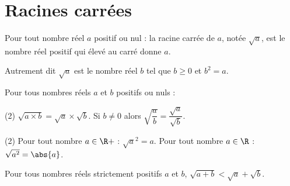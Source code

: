             \section{Racines carrées}
%
%
    \begin{dfn}
    Pour tout nombre réel $a$ positif ou nul :\newline 
    la racine carrée de $a$, notée $\sqrt{a}$, est le nombre réel positif qui élevé au carré donne $a$.
    
    Autrement dit $\sqrt{a}$ est le nombre réel $b$ tel que $b\geqslant 0$ et $b^2=a$.  
    \end{dfn}
%
    \begin{prp}
    Pour tous nombres réels $a$ et $b$ positifs ou nuls :
        \begin{tasks}[label=\labelitemi](2)
        \task $\sqrt{a\times b}=\sqrt{a}\times\sqrt{b}$.
        \task Si $b\neq 0$ alors $\sqrt{\dfrac{a}{b}}=\dfrac{\sqrt{a}}{\sqrt{b}}$.
        \end{tasks}
    \end{prp}
%
    \begin{prp}
        \begin{tasks}[label=\labelitemi](2)
        \task Pour tout nombre $a\in\R+$ : $\sqrt{a}^2=a$.
        \task Pour tout nombre $a\in\R$ : $\sqrt{a^2}=\abs{a}$.
        \end{tasks}
    \end{prp}
%
    \begin{prp}
    Pour tous nombres réels strictement positifs $a$ et $b$, $\sqrt{a+b}<\sqrt{a}+\sqrt{b}$.
    \end{prp}